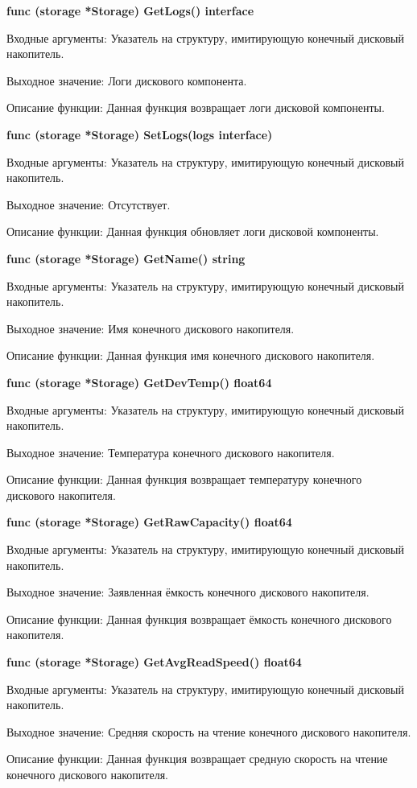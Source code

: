 \textbf{func (storage *Storage) GetLogs() interface{}}

Входные аргументы: Указатель на структуру, имитирующую конечный дисковый накопитель.

Выходное значение: Логи дискового компонента. 

Описание функции: Данная функция возвращает логи дисковой компоненты. 

\textbf{func (storage *Storage) SetLogs(logs interface{})}

Входные аргументы: Указатель на структуру, имитирующую конечный дисковый накопитель.

Выходное значение:  Отсутствует.

Описание функции: Данная функция обновляет логи дисковой компоненты. 

\textbf{func (storage *Storage) GetName() string}

Входные аргументы: Указатель на структуру, имитирующую конечный дисковый накопитель.

Выходное значение: Имя конечного дискового накопителя.

Описание функции: Данная функция имя конечного дискового накопителя.

\textbf{func (storage *Storage) GetDevTemp() float64}

Входные аргументы: Указатель на структуру, имитирующую конечный дисковый накопитель.

Выходное значение: Температура конечного дискового накопителя.

Описание функции: Данная функция возвращает температуру конечного дискового накопителя.

\textbf{func (storage *Storage) GetRawCapacity() float64}

Входные аргументы: Указатель на структуру, имитирующую конечный дисковый накопитель.

Выходное значение: Заявленная ёмкость конечного дискового накопителя.

Описание функции: Данная функция возвращает ёмкость конечного дискового накопителя.

\textbf{func (storage *Storage) GetAvgReadSpeed() float64}

Входные аргументы: Указатель на структуру, имитирующую конечный дисковый накопитель.

Выходное значение: Средняя скорость на чтение конечного дискового накопителя.

Описание функции: Данная функция возвращает средную скорость на чтение конечного дискового накопителя.

